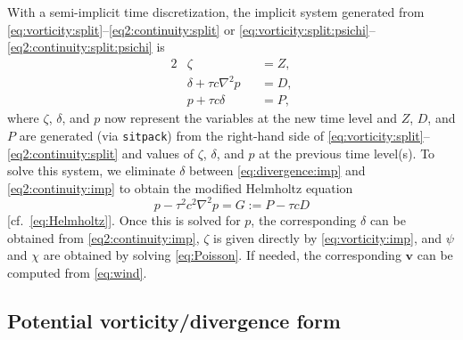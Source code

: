 \documentclass[12pt]{article}
\newcommand{\vecv}{\mathbf{v}}
\newcommand{\p}{{p}}   %
\renewcommand{\P}{{P}} %
\newcommand{\del}{\nabla}
\begin{document}
With a semi-implicit time discretization, the implicit system generated from
\eqref{eq:vorticity:split}--\eqref{eq2:continuity:split} or
\eqref{eq:vorticity:split:psichi}--\eqref{eq2:continuity:split:psichi} is
\begin{alignat}{2}
   &\zeta &&= Z ,
\label{eq:vorticity:imp}
\\
   &\delta + \tau c\del^2 \p &&= D ,
\label{eq:divergence:imp}
\\
   &\p + \tau c\delta &&= \P ,
\label{eq2:continuity:imp}
\end{alignat}
where $\zeta$, $\delta$, and $\p$ now represent the variables at the new
time level and $Z$, $D$, and $\P$ are generated (via \verb+sitpack+) from
the right-hand side of
\eqref{eq:vorticity:split}--\eqref{eq2:continuity:split} and values of
$\zeta$, $\delta$, and $\p$ at the previous time level(s).  
To solve this system, we eliminate $\delta$ between 
\eqref{eq:divergence:imp} and \eqref{eq2:continuity:imp} to
obtain the modified Helmholtz equation
\begin{equation}
  \p - \tau^2 c^2\del^2 \p = G := \P - \tau c D
\label{eq2:Helmholtz}
\end{equation}
[cf.~\eqref{eq:Helmholtz}].
Once this is solved for $\p$, the corresponding $\delta$ can be obtained
from \eqref{eq2:continuity:imp}, $\zeta$ is given directly by
\eqref{eq:vorticity:imp}, and $\psi$ and $\chi$ are obtained by solving
\eqref{eq:Poisson}.  If needed, the corresponding $\vecv$ can be computed from
\eqref{eq:wind}.

\pagebreak[2]
\subsection{Potential vorticity/divergence form\label{sec:pvd}}
\end{document}
